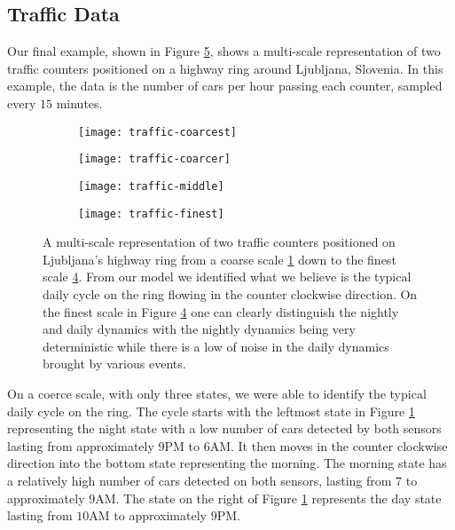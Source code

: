 \subsection{Traffic Data}

Our final example, shown in Figure \ref{fig:example-traffic-multiscale}, shows a multi-scale representation of two traffic counters positioned on a highway ring around Ljubljana, Slovenia. In this example, the data is the number of cars per hour passing each counter, sampled every $15$ minutes.  

\begin{figure}[h!]
  	\centering
  	\begin{subfigure}[b]{.48\columnwidth}
	  	\centering
	  	\texttt{[image: traffic-coarcest]}
  		\caption{\label{fig:traffic-coarcest}}
	\end{subfigure}
  	\begin{subfigure}[b]{.48\columnwidth}
	  	\centering
	  	\texttt{[image: traffic-coarcer]}
  		\caption{\label{fig:traffic-coarcer}}
	\end{subfigure}
	\begin{subfigure}[b]{.48\columnwidth}
	  	\centering
	  	\texttt{[image: traffic-middle]}
  		\caption{\label{fig:traffic-middle}}
	\end{subfigure}
	\begin{subfigure}[b]{.48\columnwidth}
	  	\centering
	  	\texttt{[image: traffic-finest]}
  		\caption{\label{fig:traffic-finest}}
	\end{subfigure}
  	\caption{A multi-scale representation of two traffic counters positioned on Ljubljana's highway ring from a coarse scale \ref{fig:traffic-coarcest} down to the finest scale \ref{fig:traffic-finest}. From our model we identified what we believe is the typical daily cycle on the ring flowing in the counter clockwise direction. On the finest scale in Figure \ref{fig:traffic-finest} one can clearly distinguish the nightly and daily dynamics with the nightly dynamics being very deterministic while there is a low of noise in the daily dynamics brought by various events.}
  	\label{fig:example-traffic-multiscale}
\end{figure}

On a coerce scale, with only three states, we were able to identify the typical daily cycle on the ring. The cycle starts with the leftmost state in Figure \ref{fig:traffic-coarcest} representing the night state with a low number of cars detected by both sensors lasting from approximately $9$PM to $6$AM. It then moves in the counter clockwise direction into the bottom state representing the morning. The morning state has a relatively high number of cars detected on both sensors, lasting from $7$ to approximately $9$AM. The state on the right of Figure \ref{fig:traffic-coarcest} represents the day state lasting from $10$AM to approximately $9$PM.

